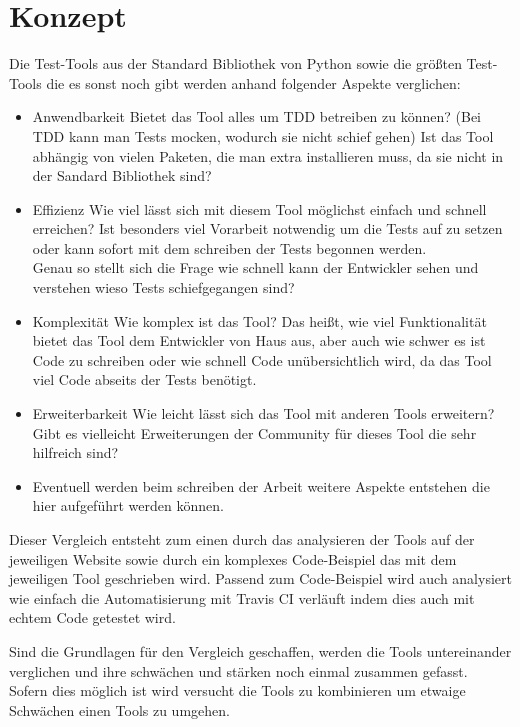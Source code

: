 \section{Konzept}
Die Test-Tools aus der Standard Bibliothek von Python sowie die größten
Test-Tools die es sonst noch gibt werden anhand folgender Aspekte verglichen:

\begin{itemize}
    \item Anwendbarkeit
        \subitem Bietet das Tool alles um TDD betreiben zu können? (Bei TDD
        kann man Tests \gls{mocken}, wodurch sie nicht schief gehen)
        Ist das Tool abhängig von vielen Paketen, die man extra installieren
        muss, da sie nicht in der Sandard Bibliothek sind?
    \item Effizienz
        \subitem Wie viel lässt sich mit diesem Tool möglichst einfach und
        schnell erreichen? Ist besonders viel Vorarbeit notwendig um die Tests
        auf zu setzen oder kann sofort mit dem schreiben der Tests begonnen
        werden.
        \newline
        \\
        Genau so stellt sich die Frage wie schnell kann der Entwickler sehen
        und verstehen wieso Tests schiefgegangen sind?
    \item Komplexität
        \subitem Wie komplex ist das Tool? Das heißt, wie viel Funktionalität
        bietet das Tool dem Entwickler von Haus aus, aber auch wie schwer es
        ist Code zu schreiben oder wie schnell Code unübersichtlich wird, da
        das Tool viel Code abseits der Tests benötigt.
    \item Erweiterbarkeit
        \subitem Wie leicht lässt sich das Tool mit anderen Tools erweitern?
        Gibt es vielleicht Erweiterungen der Community für dieses Tool die sehr
        hilfreich sind?
    \item Eventuell werden beim schreiben der Arbeit weitere Aspekte entstehen
    die hier aufgeführt werden können.
\end{itemize}

Dieser Vergleich entsteht zum einen durch das analysieren der Tools auf der
jeweiligen Website sowie durch ein komplexes Code-Beispiel das mit dem
jeweiligen Tool geschrieben wird. Passend zum Code-Beispiel wird auch analysiert
wie einfach die Automatisierung mit Travis CI verläuft indem dies auch mit
echtem Code getestet wird.

Sind die Grundlagen für den Vergleich geschaffen, werden die Tools
untereinander verglichen und ihre schwächen und stärken noch einmal zusammen
gefasst.
\newline
\\
Sofern dies möglich ist wird versucht die Tools zu kombinieren um etwaige
Schwächen einen Tools zu umgehen.

